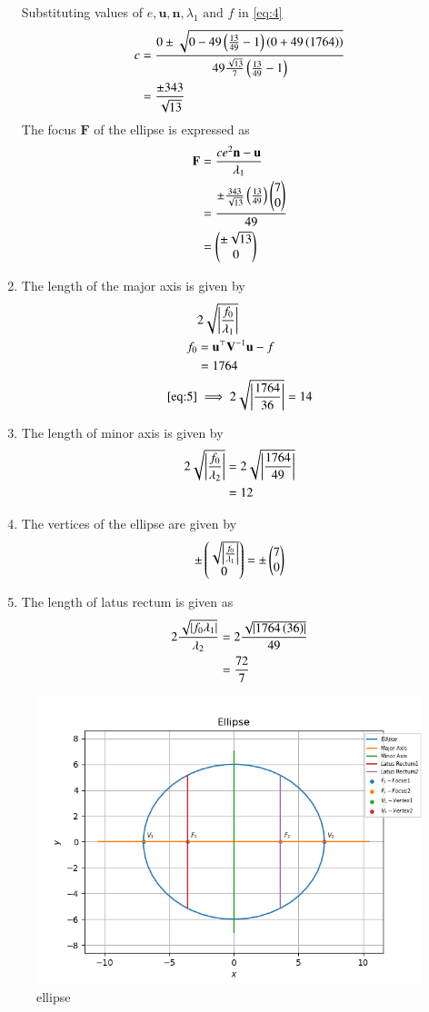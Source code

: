 \documentclass[journal,12pt,twocolumn]{IEEEtran}
\renewcommand{\vec}[1]{\boldsymbol{\mathbf{#1}}}
\begin{document}
\begin{enumerate}
Substituting values of $e,\vec{u},\vec{n},\lambda_1 \text{ and } f$ in \eqref{eq:4}
\begin{align}
	c &= \frac{0 \pm \sqrt{0-49\left(\frac{13}{49}-1\right)\left(0+49\left(1764\right)\right)}}{49\frac{\sqrt{13}}{7}\left(\frac{13}{49}-1\right)}\\
	&= \frac{\pm 343}{\sqrt{13}}
\end{align}
The focus $\vec{F}$ of the ellipse is expressed as
\begin{align}
	\vec{F} &= \frac{ce^2 \vec{n}-\vec{u}}{\lambda_1}\\
	&= \frac{\pm \frac{343}{\sqrt{13}}\brak{\frac{13}{49}}\myvec{7\\0}}{49}\\
	&= \myvec{\pm \sqrt{13}\\0}
\end{align}
\item The length of the major axis is given by
\begin{align}
	\label{eq:5}
	&2\sqrt{\abs{\frac{f_0}{\lambda_1}}}\\
	f_0 &= \vec{u}^\top \vec{V}^{-1} \vec{u} -f\\
	    &= 1764\\
	\eqref{eq:5} &\implies 2\sqrt{\abs{\frac{1764}{36}}}
	 = 14
\end{align}
\item The length of minor axis is given by
\begin{align}
	2\sqrt{\left\vert\frac{f_0}{\lambda_2}\right\vert}&= 2\sqrt{\left\vert\frac{1764}{49}\right\vert}\\
	&= 12
\end{align}
\item The vertices of the ellipse are given by
\begin{align}
	\pm \begin{pmatrix}\sqrt{\left\vert\frac{f_0}{\lambda_1}\right\vert}\\0\end{pmatrix}= \pm \begin{pmatrix}7\\0\end{pmatrix}
\end{align}
\item The length of latus rectum is given as
\begin{align}
	2\frac{\sqrt{\left\vert f_0 \lambda_1\right\vert}}{\lambda_2} &= 2\frac{\sqrt{\left\vert1764\left(36\right)\right\vert}}{49}\\
	&= \frac{72}{7}
\end{align}
\end{enumerate}

\begin{figure}[!htb]
    \centering
    \includegraphics[width=\columnwidth]{figs/ellipse.png}
    \caption{ellipse}
    \label{fig:ellipse}
\end{figure}
\end{document}
